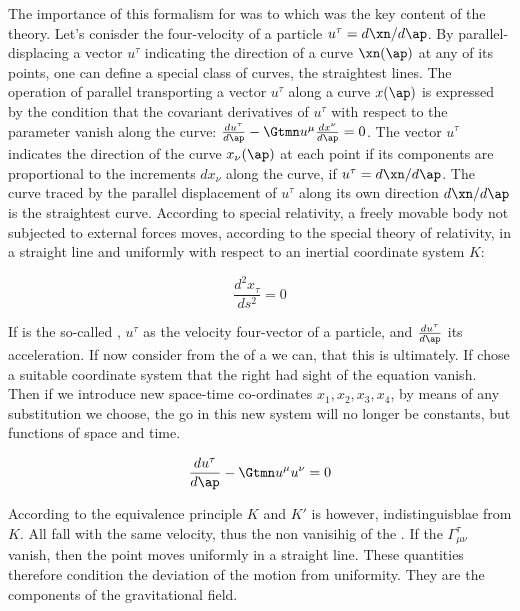 
The importance of this formalism for \gr was to which was the key content of the theory. Let's conisder the four-velocity of a particle $u^\tau=d\xn/d\ap$. By parallel-displacing a vector $u^\tau$ indicating the direction of a curve $\xn(\ap)$ at any of its points, one can define a special class of curves, the straightest lines. The operation of parallel transporting a vector $u^\tau$ along a curve $x(\ap)$ is expressed by the condition that the covariant derivatives of $u^\tau$ with respect to the parameter \ap vanish along the curve: $\frac{d u^{\tau}}{d \ap}-\Gtmn u^{\mu} \frac{d x^\nu}{d\ap}=0$. The vector $u^\tau$ indicates the direction of the curve $x_\nu(\ap)$ at each point if its components are proportional to the increments $dx_\nu$ along the curve, \ie if $u^\tau=d\xn/d\ap$. The curve traced by the parallel displacement of $u^\tau$ along its own direction $d\xn/d\ap$ is the straightest curve. According to special relativity, a freely movable body not subjected to external forces moves, according to the special theory of relativity, in a straight line and uniformly with respect to an inertial coordinate system $K$:

\begin{equation}\label{eq:geodesicelectro}
\frac{d^{2} x_{\tau}}{d s^{2}} = 0
\end{equation}

If \ap is the so-called , $u^\tau$ as the velocity four-vector of a particle, and $\frac{d {u^\tau}}{d\ap}$ its acceleration. If now consider from the of a we can, that this is ultimately. If chose a suitable coordinate system that the right had sight of the equation vanish. Then if we introduce new space-time co-ordinates $x_{1}, x_{2}, x_{3}, x_{4}$, by means of any substitution we choose, the go in this new system will no longer be constants, but functions of space and time.

\begin{equation*}
\frac{d {u^\tau}}{d\ap} - \Gtmn u^{\mu} u^\nu =0 
\end{equation*}
 
According to the equivalence principle $K$ and $K'$ is however, indistinguisblae from $K$. All fall with the same velocity, thus the non vanisihig of the \gmn. If the $\Gamma_{\mu \nu}^{\tau}$ vanish, then the point moves uniformly in a straight line. These quantities therefore condition the deviation of the motion from uniformity. They are the components of the gravitational field.


